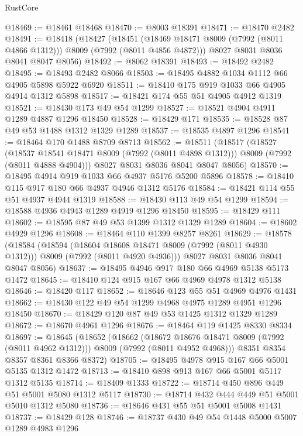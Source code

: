 \begin{lexlean}{RustCore}
\begin{coremodule}
@18469 := @18461 @18468
@18470 := @8003 @18391
@18471 := @18470 @2482
@18491 := @18418
    (@18427
      (@18451 (@18469 @18471 @8009 (@7992 (@8011 @4866 @1312))) @8009 (@7992 (@8011 @4856 @4872)))
      @8027
      @8031
      @8036
      @8041
      @8047
      @8056)
@18492 := @8062 @18391
@18493 := @18492 @2482
@18495 := @18493 @2482 @8066
@18503 := @18495 @4882 @1034 @1112 @66 @4905 @5898 @5922 @6920
@18511 := @18410 @175 @919 @1033 @66 @4905 @4914 @1312 @5898
@18517 := @18421 @174 @55 @51 @4905 @4912 @1319
@18521 := @18430 @173 @49 @54 @1299
@18527 := @18521 @4904 @4911 @1289 @4887 @1296 @18450
@18528 := @18429 @171
@18535 := @18528 @87 @49 @53 @1488 @1312 @1329 @1289
@18537 := @18535 @4897 @1296
@18541 := @18464 @170 @1488 @8709 @8713
@18562 := @18511
    (@18517
      (@18527
        (@18537 @18541 @18471 @8009 (@7992 (@8011 @4898 @1312)))
        @8009
        (@7992 (@8011 @4888 @4904)))
      @8027
      @8031
      @8036
      @8041
      @8047
      @8056)
@18570 := @18495 @4914 @919 @1033 @66 @4937 @5176 @5200 @5896
@18578 := @18410 @115 @917 @180 @66 @4937 @4946 @1312 @5176
@18584 := @18421 @114 @55 @51 @4937 @4944 @1319
@18588 := @18430 @113 @49 @54 @1299
@18594 := @18588 @4936 @4943 @1289 @4919 @1296 @18450
@18595 := @18429 @111
@18602 := @18595 @87 @49 @53 @1399 @1312 @1329 @1289
@18604 := @18602 @4929 @1296
@18608 := @18464 @110 @1399 @8257 @8261
@18629 := @18578
    (@18584
      (@18594
        (@18604 @18608 @18471 @8009 (@7992 (@8011 @4930 @1312)))
        @8009
        (@7992 (@8011 @4920 @4936)))
      @8027
      @8031
      @8036
      @8041
      @8047
      @8056)
@18637 := @18495 @4946 @917 @180 @66 @4969 @5138 @5173 @1472
@18645 := @18410 @124 @915 @167 @66 @4969 @4978 @1312 @5138
@18646 := @18420 @117
@18652 := @18646 @123 @55 @51 @4969 @4976 @1431
@18662 := @18430 @122 @49 @54 @1299 @4968 @4975 @1289 @4951 @1296 @18450
@18670 := @18429 @120 @87 @49 @53 @1425 @1312 @1329 @1289
@18672 := @18670 @4961 @1296
@18676 := @18464 @119 @1425 @8330 @8334
@18697 := @18645
    (@18652
      (@18662
        (@18672 @18676 @18471 @8009 (@7992 (@8011 @4962 @1312)))
        @8009
        (@7992 (@8011 @4952 @4968)))
      @8351
      @8354
      @8357
      @8361
      @8366
      @8372)
@18705 := @18495 @4978 @915 @167 @66 @5001 @5135 @1312 @1472
@18713 := @18410 @898 @913 @167 @66 @5001 @5117 @1312 @5135
@18714 := @18409 @1333
@18722 := @18714 @450 @896 @449 @51 @5001 @5080 @1312 @5117
@18730 := @18714 @432 @444 @449 @51 @5001 @5010 @1312 @5080
@18736 := @18646 @431 @55 @51 @5001 @5008 @1431
@18737 := @18429 @128
@18746 := @18737 @430 @49 @54 @1448 @5000 @5007 @1289 @4983 @1296

\end{coremodule}
\end{lexlean}
